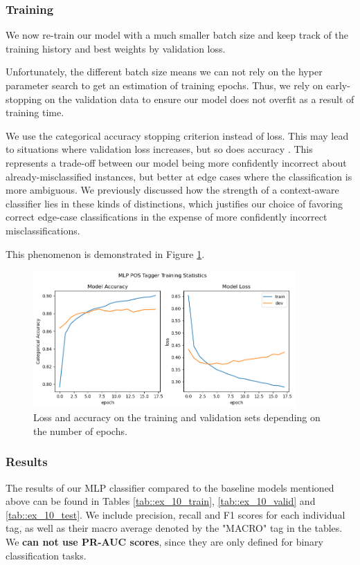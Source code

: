 \documentclass[10pt, a4paper]{article}
\begin{document}
	
	\subsubsection{Training}
		
	We now re-train our model with a much smaller batch size and keep track of the training history and best weights by validation loss. 
	
	Unfortunately, the different batch size means we can not rely on the hyper parameter search to get an estimation of training epochs. Thus, we rely on early-stopping on the validation data to ensure our model does not overfit as a result of training time. 
	
	We use the categorical accuracy stopping criterion instead of loss. This may lead to situations where validation loss increases, but so does accuracy \cite{loss-accuracy}. This represents a trade-off between our model being more confidently incorrect about already-misclassified instances, but better at edge cases where the classification is more ambiguous. We previously discussed how the strength of a context-aware classifier lies in these kinds of distinctions, which justifies our choice of favoring correct edge-case classifications in the expense of more confidently incorrect misclassifications.
	
	This phenomenon is demonstrated in Figure \ref{fig::ex_10_fit}.
	
	\begin{figure}
		\centering
		\includegraphics[width=10cm]{"ex_10_fit.png"}
		\caption{Loss and accuracy on the training and validation sets depending on the number of epochs.}
		\label{fig::ex_10_fit}
	\end{figure}
	
	\subsubsection{Results}
	
	The results of our MLP classifier compared to the baseline models mentioned above can be found in Tables \ref{tab::ex_10_train},    \ref{tab::ex_10_valid} and \ref{tab::ex_10_test}. We include precision, recall and F1 scores for each individual tag, as well as their macro average denoted by the "MACRO" tag in the tables. We \textbf{can not use PR-AUC scores}, since they are only defined for binary classification tasks.
	
\end{document}
